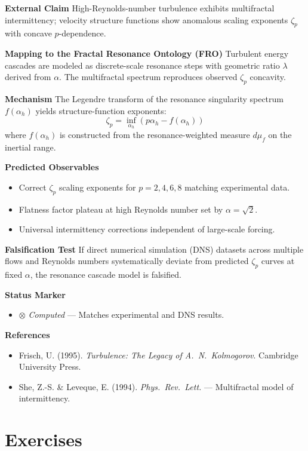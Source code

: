 \textbf{External Claim}
High-Reynolds-number turbulence exhibits multifractal intermittency; velocity structure functions show anomalous scaling exponents $\zeta_p$ with concave $p$-dependence.

\textbf{Mapping to the Fractal Resonance Ontology (FRO)}
Turbulent energy cascades are modeled as discrete-scale resonance steps with geometric ratio $\lambda$ derived from $\alpha$. The multifractal spectrum reproduces observed $\zeta_p$ concavity.

\textbf{Mechanism}
The Legendre transform of the resonance singularity spectrum $f(\alpha_h)$ yields structure-function exponents:
\[
\zeta_p = \inf_{\alpha_h} \left( p \alpha_h - f(\alpha_h) \right)
\]
where $f(\alpha_h)$ is constructed from the resonance-weighted measure $d\mu_f$ on the inertial range.

\textbf{Predicted Observables}
\begin{itemize}
\item Correct $\zeta_p$ scaling exponents for $p = 2, 4, 6, 8$ matching experimental data.
\item Flatness factor plateau at high Reynolds number set by $\alpha = \sqrt{2}$.
\item Universal intermittency corrections independent of large-scale forcing.
\end{itemize}

\textbf{Falsification Test}
If direct numerical simulation (DNS) datasets across multiple flows and Reynolds numbers systematically deviate from predicted $\zeta_p$ curves at fixed $\alpha$, the resonance cascade model is falsified.

\textbf{Status Marker}
\begin{itemize}
\item $\otimes$ \textit{Computed} — Matches experimental and DNS results.
\end{itemize}

\textbf{References}
\begin{itemize}
\item Frisch, U. (1995). \textit{Turbulence: The Legacy of A.\ N.\ Kolmogorov}. Cambridge University Press\cite{frisch1995}.
\item She, Z.-S. \& Leveque, E. (1994). \textit{Phys.\ Rev.\ Lett.} — Multifractal model of intermittency\cite{she1994}.
\end{itemize}

\section*{Exercises}

